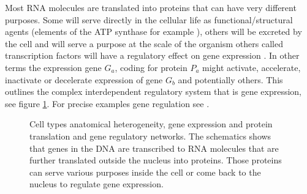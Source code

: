 	Most RNA molecules are translated into proteins that can have very different purposes. Some will serve directly in the cellular life as functional/structural agents (elements of the ATP synthase for example \cite{boyer97}), others will be excreted by the cell and will serve a purpose at the scale of the organism \cite{kaiser84} others called transcription factors will have a regulatory effect on gene expression \cite{mitchell89}. In other terms the expression gene $G_a$, coding for protein $P_a$ might activate, accelerate, inactivate or decelerate expression of gene $G_b$ and potentially others. This outlines the complex interdependent regulatory system that is gene expression, see figure \ref{fig:cells}. For precise examples gene regulation see \cite{gossen92, shinozaki03,fuqua01,balmer02}.\\
	
\begin{figure}[bth]
        \myfloatalign
         \quad
        \caption{Cell types anatomical heterogeneity, gene expression and protein translation and gene regulatory networks. The schematics shows that genes in the DNA are transcribed to RNA molecules that are further translated outside the nucleus into proteins. Those proteins can serve various purposes inside the cell or come back to the nucleus to regulate gene expression.}\label{fig:cells}
\end{figure}
	

